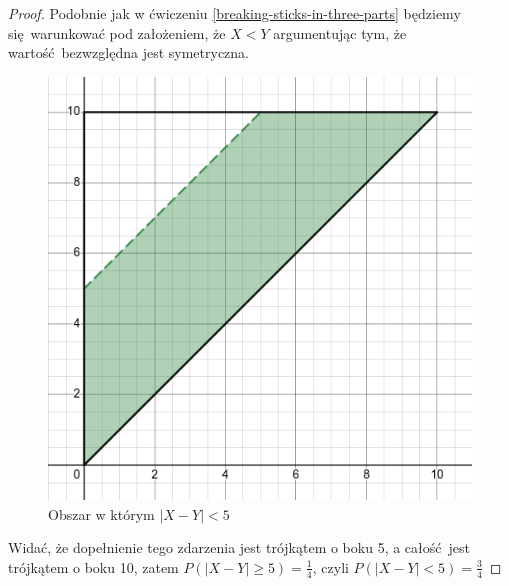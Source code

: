 \begin{proof}
	Podobnie jak w ćwiczeniu \ref{breaking-sticks-in-three-parts} będziemy się warunkować pod założeniem, że \( X < Y \) argumentując tym, że wartość bezwzględna jest symetryczna.

	\begin{figure}[H]
		\centering
		\includegraphics[scale=0.5]{img/continuous probability/distance-of-two-uniform-variables.png}
		\caption{Obszar w którym \( |X - Y| < 5\) }
	\end{figure}

	Widać, że dopełnienie tego zdarzenia jest trójkątem o boku 5, a całość jest trójkątem o boku 10,
	zatem \( P(|X - Y| \geq 5) = \frac{1}{4} \), czyli \( P(|X - Y| < 5) = \frac{3}{4} \)
\end{proof}
